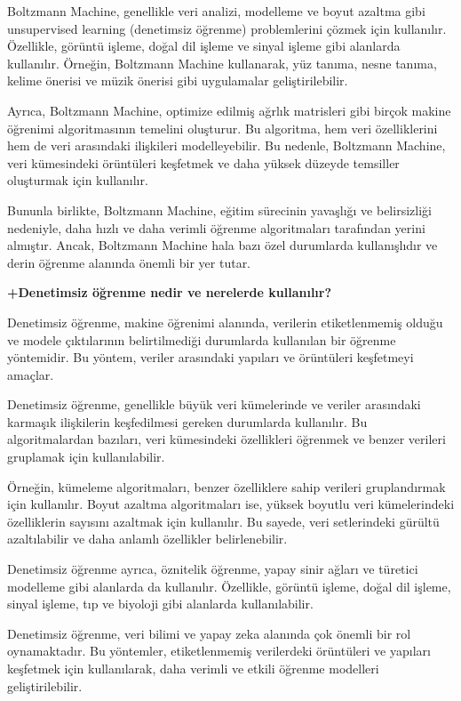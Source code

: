 \documentclass[11pt]{article}
\begin{document}
Boltzmann Machine, genellikle veri analizi, modelleme ve boyut azaltma gibi unsupervised learning (denetimsiz öğrenme) problemlerini çözmek için kullanılır. Özellikle, görüntü işleme, doğal dil işleme ve sinyal işleme gibi alanlarda kullanılır. Örneğin, Boltzmann Machine kullanarak, yüz tanıma, nesne tanıma, kelime önerisi ve müzik önerisi gibi uygulamalar geliştirilebilir.

Ayrıca, Boltzmann Machine, optimize edilmiş ağrlık matrisleri gibi birçok makine öğrenimi algoritmasının temelini oluşturur. Bu algoritma, hem veri özelliklerini hem de veri arasındaki ilişkileri modelleyebilir. Bu nedenle, Boltzmann Machine, veri kümesindeki örüntüleri keşfetmek ve daha yüksek düzeyde temsiller oluşturmak için kullanılır.

Bununla birlikte, Boltzmann Machine, eğitim sürecinin yavaşlığı ve belirsizliği nedeniyle, daha hızlı ve daha verimli öğrenme algoritmaları tarafından yerini almıştır. Ancak, Boltzmann Machine hala bazı özel durumlarda kullanışlıdır ve derin öğrenme alanında önemli bir yer tutar.

\textbf{+Denetimsiz öğrenme nedir ve nerelerde kullanılır?}

Denetimsiz öğrenme, makine öğrenimi alanında, verilerin etiketlenmemiş olduğu ve modele çıktılarının belirtilmediği durumlarda kullanılan bir öğrenme yöntemidir. Bu yöntem, veriler arasındaki yapıları ve örüntüleri keşfetmeyi amaçlar.

Denetimsiz öğrenme, genellikle büyük veri kümelerinde ve veriler arasındaki karmaşık ilişkilerin keşfedilmesi gereken durumlarda kullanılır. Bu algoritmalardan bazıları, veri kümesindeki özellikleri öğrenmek ve benzer verileri gruplamak için kullanılabilir.

Örneğin, kümeleme algoritmaları, benzer özelliklere sahip verileri gruplandırmak için kullanılır. Boyut azaltma algoritmaları ise, yüksek boyutlu veri kümelerindeki özelliklerin sayısını azaltmak için kullanılır. Bu sayede, veri setlerindeki gürültü azaltılabilir ve daha anlamlı özellikler belirlenebilir.

Denetimsiz öğrenme ayrıca, öznitelik öğrenme, yapay sinir ağları ve türetici modelleme gibi alanlarda da kullanılır. Özellikle, görüntü işleme, doğal dil işleme, sinyal işleme, tıp ve biyoloji gibi alanlarda kullanılabilir.

Denetimsiz öğrenme, veri bilimi ve yapay zeka alanında çok önemli bir rol oynamaktadır. Bu yöntemler, etiketlenmemiş verilerdeki örüntüleri ve yapıları keşfetmek için kullanılarak, daha verimli ve etkili öğrenme modelleri geliştirilebilir.
\end{document}
